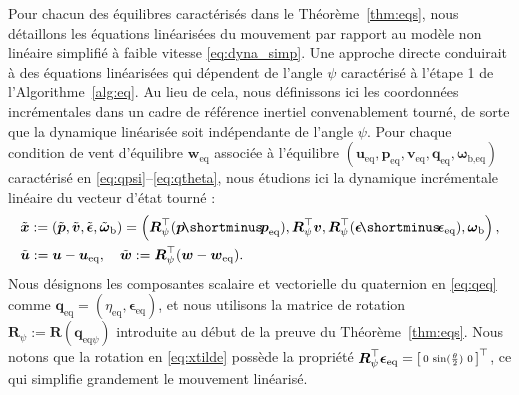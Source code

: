 Pour chacun des équilibres caractérisés dans le Théorème~\ref{thm:eqs}, nous détaillons les équations linéarisées du mouvement par rapport au modèle non linéaire simplifié à faible vitesse \eqref{eq:dyna_simp}. Une approche directe conduirait à des équations linéarisées qui dépendent de l'angle $\psi$ caractérisé à l'étape 1 de l'Algorithme~\ref{alg:eq}. Au lieu de cela, nous définissons ici les coordonnées incrémentales dans un cadre de référence inertiel convenablement tourné, de sorte que la dynamique linéarisée soit indépendante de l'angle $\psi$.
Pour chaque condition de vent d'équilibre $\boldsymbol{w}_{\text{eq}}$ associée à l'équilibre $(\boldsymbol{u}_{\text{eq}}, \boldsymbol{p}_{\text{eq}},\boldsymbol{v}_{\text{eq}}, \boldsymbol{q}_{\text{eq}},\boldsymbol{\omega}_{\text{b},\text{eq}})$  caractérisé en \eqref{eq:qpsi}--\eqref{eq:qtheta}, nous étudions ici la dynamique incrémentale linéaire du vecteur d'état tourné :  
\begin{align}
\label{eq:xtilde}
     \nonumber &\tilde{\boldsymbol{x}} := (\tilde{\boldsymbol{p}},
     \tilde{\boldsymbol{v}},
     \tilde{\boldsymbol{\epsilon}},
     \tilde{\boldsymbol{\omega}}_{\text{b}}) = \left(\boldsymbol{R}^\top_{\psi} (\boldsymbol{p} \! \shortminus \! \boldsymbol{p}_{\text{eq}}), \boldsymbol{R}^\top_{\psi} \boldsymbol{v}, \boldsymbol{R}^\top_{\psi} (\boldsymbol{\epsilon} \! \shortminus \! \boldsymbol{\epsilon}_{\text{eq}}), \boldsymbol{\omega}_{\text{b}} \right), \\ &\tilde{\boldsymbol{u}} := \boldsymbol{u}-\boldsymbol{u_{\text{eq}}}, \quad \tilde{\boldsymbol{w}} := \boldsymbol{R}^\top_{\psi} (\boldsymbol{w}-\boldsymbol{w}_{\mathrm{eq}}).
\end{align}
Nous désignons les composantes scalaire et vectorielle du quaternion en \eqref{eq:qeq} comme $\boldsymbol{q}_{\text{eq}} = (\eta_{\text{eq}}, \boldsymbol{\epsilon}_{\text{eq}})$, et nous utilisons la matrice de rotation $\boldsymbol{R}_{\psi} := \boldsymbol{R}(\boldsymbol{q}_{\mathrm{eq}\psi})$ introduite au début de la preuve du Théorème~\ref{thm:eqs}.
Nous notons que la rotation en \eqref{eq:xtilde} possède la propriété $\boldsymbol{R}^\top_{\psi} \boldsymbol{\epsilon}_{\text{eq}} = \left[ \begin{smallmatrix}0 & \sin(\frac{\theta}{2}) & 0 \end{smallmatrix} \right]^\top$, ce qui simplifie grandement le mouvement linéarisé.

